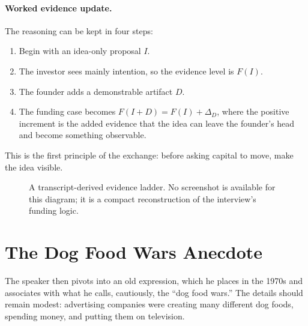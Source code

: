 \paragraph{Worked evidence update.}
The reasoning can be kept in four steps:
\begin{enumerate}
\item Begin with an idea-only proposal \(I\).
\item The investor sees mainly intention, so the evidence level is \(F(I)\).
\item The founder adds a demonstrable artifact \(D\).
\item The funding case becomes \(F(I+D)=F(I)+\Delta_D\), where the positive increment is the added evidence that the idea can leave the founder's head and become something observable.
\end{enumerate}

This is the first principle of the exchange: before asking capital to move, make the idea visible.

\begin{figure}
\centering
{}
\caption{A transcript-derived evidence ladder. No screenshot is available for this diagram; it is a compact reconstruction of the interview's funding logic.}
\end{figure}

\section{The Dog Food Wars Anecdote}

The speaker then pivots into an old expression, which he places in the 1970s and associates with what he calls, cautiously, the ``dog food wars.'' The details should remain modest: advertising companies were creating many different dog foods, spending money, and putting them on television.

